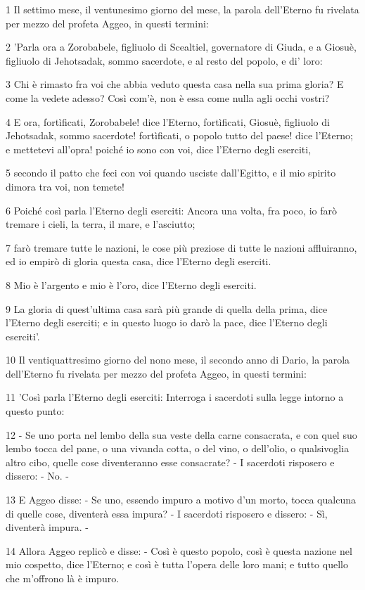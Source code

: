 \par 1 Il settimo mese, il ventunesimo giorno del mese, la parola dell'Eterno fu rivelata per mezzo del profeta Aggeo, in questi termini:
\par 2 'Parla ora a Zorobabele, figliuolo di Scealtiel, governatore di Giuda, e a Giosuè, figliuolo di Jehotsadak, sommo sacerdote, e al resto del popolo, e di' loro:
\par 3 Chi è rimasto fra voi che abbia veduto questa casa nella sua prima gloria? E come la vedete adesso? Così com'è, non è essa come nulla agli occhi vostri?
\par 4 E ora, fortìficati, Zorobabele! dice l'Eterno, fortìficati, Giosuè, figliuolo di Jehotsadak, sommo sacerdote! fortìficati, o popolo tutto del paese! dice l'Eterno; e mettetevi all'opra! poiché io sono con voi, dice l'Eterno degli eserciti,
\par 5 secondo il patto che feci con voi quando usciste dall'Egitto, e il mio spirito dimora tra voi, non temete!
\par 6 Poiché così parla l'Eterno degli eserciti: Ancora una volta, fra poco, io farò tremare i cieli, la terra, il mare, e l'asciutto;
\par 7 farò tremare tutte le nazioni, le cose più preziose di tutte le nazioni affluiranno, ed io empirò di gloria questa casa, dice l'Eterno degli eserciti.
\par 8 Mio è l'argento e mio è l'oro, dice l'Eterno degli eserciti.
\par 9 La gloria di quest'ultima casa sarà più grande di quella della prima, dice l'Eterno degli eserciti; e in questo luogo io darò la pace, dice l'Eterno degli eserciti'.
\par 10 Il ventiquattresimo giorno del nono mese, il secondo anno di Dario, la parola dell'Eterno fu rivelata per mezzo del profeta Aggeo, in questi termini:
\par 11 'Così parla l'Eterno degli eserciti: Interroga i sacerdoti sulla legge intorno a questo punto:
\par 12 - Se uno porta nel lembo della sua veste della carne consacrata, e con quel suo lembo tocca del pane, o una vivanda cotta, o del vino, o dell'olio, o qualsivoglia altro cibo, quelle cose diventeranno esse consacrate? - I sacerdoti risposero e dissero: - No. -
\par 13 E Aggeo disse: - Se uno, essendo impuro a motivo d'un morto, tocca qualcuna di quelle cose, diventerà essa impura? - I sacerdoti risposero e dissero: - Sì, diventerà impura. -
\par 14 Allora Aggeo replicò e disse: - Così è questo popolo, così è questa nazione nel mio cospetto, dice l'Eterno; e così è tutta l'opera delle loro mani; e tutto quello che m'offrono là è impuro.
